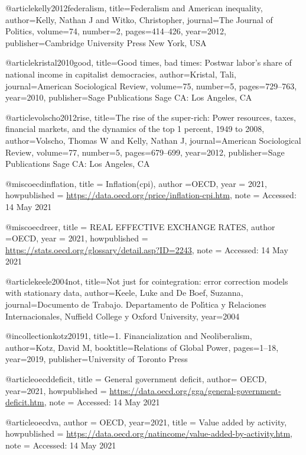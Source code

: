 @article{kelly2012federalism,
  title={Federalism and American inequality},
  author={Kelly, Nathan J and Witko, Christopher},
  journal={The Journal of Politics},
  volume={74},
  number={2},
  pages={414--426},
  year={2012},
  publisher={Cambridge University Press New York, USA}
}

@article{kristal2010good,
  title={Good times, bad times: Postwar labor’s share of national income in capitalist democracies},
  author={Kristal, Tali},
  journal={American Sociological Review},
  volume={75},
  number={5},
  pages={729--763},
  year={2010},
  publisher={Sage Publications Sage CA: Los Angeles, CA}
}

@article{volscho2012rise,
  title={The rise of the super-rich: Power resources, taxes, financial markets, and the dynamics of the top 1 percent, 1949 to 2008},
  author={Volscho, Thomas W and Kelly, Nathan J},
  journal={American Sociological Review},
  volume={77},
  number={5},
  pages={679--699},
  year={2012},
  publisher={Sage Publications Sage CA: Los Angeles, CA}
}

@misc{oecdinflation,
  title = {Inflation(cpi)},
  author ={{OECD}},
  year = {2021},
  howpublished = {\url{https://data.oecd.org/price/inflation-cpi.htm}},
  note = {Accessed: 14 May 2021}
}

@misc{oecdreer,
  title = {REAL EFFECTIVE EXCHANGE RATES},
  author ={{OECD}},
  year = {2021},
  howpublished = {\url{https://stats.oecd.org/glossary/detail.asp?ID=2243}},
  note = {Accessed: 14 May 2021}
}

@article{keele2004not,
  title={Not just for cointegration: error correction models with stationary data},
  author={Keele, Luke and De Boef, Suzanna},
  journal={Documento de Trabajo. Departamento de Pol{\'\i}tica y Relaciones Internacionales, Nuffield College y Oxford University},
  year={2004}
}

@incollection{kotz20191,
  title={1. Financialization and Neoliberalism},
  author={Kotz, David M},
  booktitle={Relations of Global Power},
  pages={1--18},
  year={2019},
  publisher={University of Toronto Press}
}

@article{oecddeficit,
  title = {General government deficit},
  author= {{OECD}},
  year={2021},
  howpublished = {\url{https://data.oecd.org/gga/general-government-deficit.htm}},
  note = {Accessed: 14 May 2021}
}

@article{oecdva,
  author = {{OECD}},
  year={2021},
  title = {Value added by activity},
  howpublished = {\url{https://data.oecd.org/natincome/value-added-by-activity.htm}},
  note = {Accessed: 14 May 2021}
}


